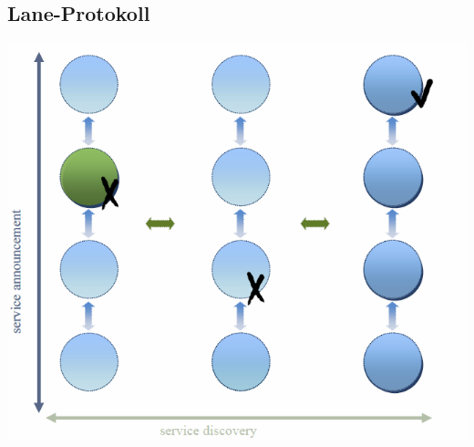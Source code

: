 \documentclass{article} %
\begin{document}
	\subsection{Lane-Protokoll}
		\begin{center}
		\includegraphics[scale=0.5]{img/lane.png}
		\end{center}
\end{document}
